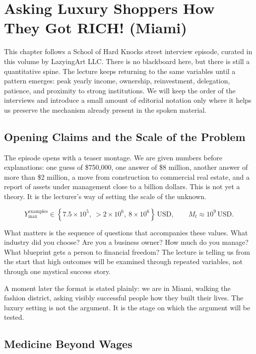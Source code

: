 \chapter{Asking Luxury Shoppers How They Got RICH! (Miami)}

This chapter follows a School of Hard Knocks street interview episode, curated in this volume by LazyingArt LLC. There is no blackboard here, but there is still a quantitative spine. The lecture keeps returning to the same variables until a pattern emerges: peak yearly income, ownership, reinvestment, delegation, patience, and proximity to strong institutions. We will keep the order of the interviews and introduce a small amount of editorial notation only where it helps us preserve the mechanism already present in the spoken material.

\section{Opening Claims and the Scale of the Problem}

The episode opens with a teaser montage. We are given numbers before explanations: one guess of \$750{,}000, one answer of \$8 million, another answer of more than \$2 million, a move from construction to commercial real estate, and a report of assets under management close to a billion dollars. This is not yet a theory. It is the lecturer's way of setting the scale of the unknown.

\begin{equation}
Y_{\max}^{\text{examples}} \in \left\{7.5\times 10^5,\ >2\times 10^6,\ 8\times 10^6\right\}\,\mathrm{USD},
\qquad
M_t \approx 10^9\,\mathrm{USD}.
\end{equation}

What matters is the sequence of questions that accompanies these values. What industry did you choose? Are you a business owner? How much do you manage? What blueprint gets a person to financial freedom? The lecture is telling us from the start that high outcomes will be examined through repeated variables, not through one mystical success story.

A moment later the format is stated plainly: we are in Miami, walking the fashion district, asking visibly successful people how they built their lives. The luxury setting is not the argument. It is the stage on which the argument will be tested.

\section{Medicine Beyond Wages}

